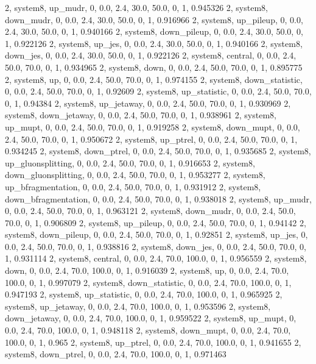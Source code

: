 2, system8, up_mudr,         0, 0.0, 2.4, 30.0, 50.0, 0, 1, 0.945326
2, system8, down_mudr,       0, 0.0, 2.4, 30.0, 50.0, 0, 1, 0.916966
2, system8, up_pileup,       0, 0.0, 2.4, 30.0, 50.0, 0, 1, 0.940166
2, system8, down_pileup,     0, 0.0, 2.4, 30.0, 50.0, 0, 1, 0.922126
2, system8, up_jes,          0, 0.0, 2.4, 30.0, 50.0, 0, 1, 0.940166
2, system8, down_jes,        0, 0.0, 2.4, 30.0, 50.0, 0, 1, 0.922126
2, system8, central,    0, 0.0, 2.4, 50.0, 70.0, 0, 1, 0.934965
2, system8, down,       0, 0.0, 2.4, 50.0, 70.0, 0, 1, 0.895775
2, system8, up,         0, 0.0, 2.4, 50.0, 70.0, 0, 1, 0.974155
2, system8, down_statistic,       0, 0.0, 2.4, 50.0, 70.0, 0, 1, 0.92609
2, system8, up_statistic,         0, 0.0, 2.4, 50.0, 70.0, 0, 1, 0.94384
2, system8, up_jetaway,      0, 0.0, 2.4, 50.0, 70.0, 0, 1, 0.930969
2, system8, down_jetaway,    0, 0.0, 2.4, 50.0, 70.0, 0, 1, 0.938961
2, system8, up_mupt,         0, 0.0, 2.4, 50.0, 70.0, 0, 1, 0.919258
2, system8, down_mupt,       0, 0.0, 2.4, 50.0, 70.0, 0, 1, 0.950672
2, system8, up_ptrel,        0, 0.0, 2.4, 50.0, 70.0, 0, 1, 0.934245
2, system8, down_ptrel,      0, 0.0, 2.4, 50.0, 70.0, 0, 1, 0.935685
2, system8, up_gluonsplitting, 0, 0.0, 2.4, 50.0, 70.0, 0, 1, 0.916653
2, system8, down_gluonsplitting, 0, 0.0, 2.4, 50.0, 70.0, 0, 1, 0.953277
2, system8, up_bfragmentation, 0, 0.0, 2.4, 50.0, 70.0, 0, 1, 0.931912
2, system8, down_bfragmentation, 0, 0.0, 2.4, 50.0, 70.0, 0, 1, 0.938018
2, system8, up_mudr,         0, 0.0, 2.4, 50.0, 70.0, 0, 1, 0.963121
2, system8, down_mudr,       0, 0.0, 2.4, 50.0, 70.0, 0, 1, 0.906809
2, system8, up_pileup,       0, 0.0, 2.4, 50.0, 70.0, 0, 1, 0.94142
2, system8, down_pileup,     0, 0.0, 2.4, 50.0, 70.0, 0, 1, 0.92851
2, system8, up_jes,          0, 0.0, 2.4, 50.0, 70.0, 0, 1, 0.938816
2, system8, down_jes,        0, 0.0, 2.4, 50.0, 70.0, 0, 1, 0.931114
2, system8, central,    0, 0.0, 2.4, 70.0, 100.0, 0, 1, 0.956559
2, system8, down,       0, 0.0, 2.4, 70.0, 100.0, 0, 1, 0.916039
2, system8, up,         0, 0.0, 2.4, 70.0, 100.0, 0, 1, 0.997079
2, system8, down_statistic,       0, 0.0, 2.4, 70.0, 100.0, 0, 1, 0.947193
2, system8, up_statistic,         0, 0.0, 2.4, 70.0, 100.0, 0, 1, 0.965925
2, system8, up_jetaway,      0, 0.0, 2.4, 70.0, 100.0, 0, 1, 0.953596
2, system8, down_jetaway,    0, 0.0, 2.4, 70.0, 100.0, 0, 1, 0.959522
2, system8, up_mupt,         0, 0.0, 2.4, 70.0, 100.0, 0, 1, 0.948118
2, system8, down_mupt,       0, 0.0, 2.4, 70.0, 100.0, 0, 1, 0.965
2, system8, up_ptrel,        0, 0.0, 2.4, 70.0, 100.0, 0, 1, 0.941655
2, system8, down_ptrel,      0, 0.0, 2.4, 70.0, 100.0, 0, 1, 0.971463
